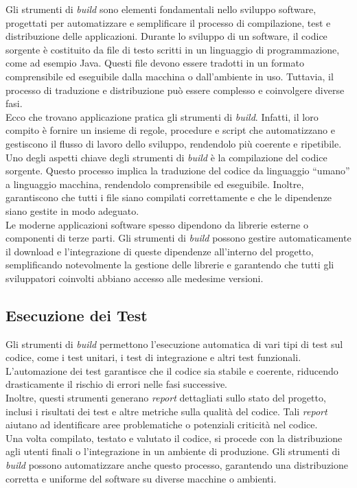 Gli strumenti di \textit{build} sono elementi fondamentali nello sviluppo software, progettati per automatizzare e semplificare il processo di compilazione, test e distribuzione delle applicazioni.\cite{BUILD_browserstack} Durante lo sviluppo di un software, il codice sorgente è costituito da file di testo scritti in un linguaggio di programmazione, come ad esempio Java. Questi file devono essere tradotti in un formato comprensibile ed eseguibile dalla macchina o dall’ambiente in uso. Tuttavia, il processo di traduzione e distribuzione può essere complesso e coinvolgere diverse fasi.\\
Ecco che trovano applicazione pratica gli strumenti di \textit{build}. Infatti, il loro compito è fornire un insieme di regole, procedure e script che automatizzano e gestiscono il flusso di lavoro dello sviluppo, rendendolo più coerente e ripetibile. Uno degli aspetti chiave degli strumenti di \textit{build} è la compilazione del codice sorgente. Questo processo implica la traduzione del codice da linguaggio “umano” a linguaggio macchina, rendendolo comprensibile ed eseguibile. Inoltre, garantiscono che tutti i file siano compilati correttamente e che le dipendenze siano gestite in modo adeguato.\cite{BUILD_dev}\\
Le moderne applicazioni software spesso dipendono da librerie esterne o componenti di terze parti. Gli strumenti di \textit{build} possono gestire automaticamente il download e l’integrazione di queste dipendenze all’interno del progetto, semplificando notevolmente la gestione delle librerie e garantendo che tutti gli sviluppatori coinvolti abbiano accesso alle medesime versioni.\cite{BUILD_browserstack}

\subsection{Esecuzione dei Test}

Gli strumenti di \textit{build} permettono l’esecuzione automatica di vari tipi di test sul codice, come i test unitari, i test di integrazione e altri test funzionali. L’automazione dei test garantisce che il codice sia stabile e coerente, riducendo drasticamente il rischio di errori nelle fasi successive.\\
Inoltre, questi strumenti generano \textit{report} dettagliati sullo stato del progetto, inclusi i risultati dei test e altre metriche sulla qualità del codice. Tali \textit{report} aiutano ad identificare aree problematiche o potenziali criticità nel codice.\\
Una volta compilato, testato e valutato il codice, si procede con la distribuzione agli utenti finali o l’integrazione in un ambiente di produzione. Gli strumenti di \textit{build} possono automatizzare anche questo processo, garantendo una distribuzione corretta e uniforme del software su diverse macchine o ambienti.\cite{BUILD_browserstack}

